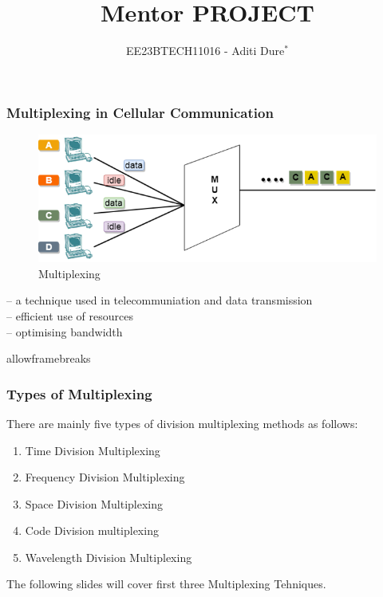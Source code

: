 \documentclass{beamer}
\begin{document}
\title{Mentor PROJECT}
\author{EE23BTECH11016 - Aditi Dure$^{*}$}
\date{}
\frame{\titlepage}

\begin{frame}
\frametitle{Multiplexing in Cellular Communication}
\begin{figure}
	\includegraphics[scale = 0.5]{figs/multiplexing.png}
	\caption{Multiplexing}
\end{figure}
-- a technique used in telecommuniation and data transmission \\
-- efficient use of resources \\
-- optimising bandwidth
\end{frame}

\begin{frame}{allowframebreaks}
\frametitle{Types of Multiplexing}
There are mainly five types of division multiplexing methods as follows:
                \begin{enumerate}
                        \item Time Division Multiplexing
                        \item Frequency Division Multiplexing
                        \item Space Division Multiplexing
                        \item Code Division multiplexing
                        \item Wavelength Division Multiplexing
                \end{enumerate}
The following slides will cover first three Multiplexing Tehniques.
\end{frame}
\end{document}
